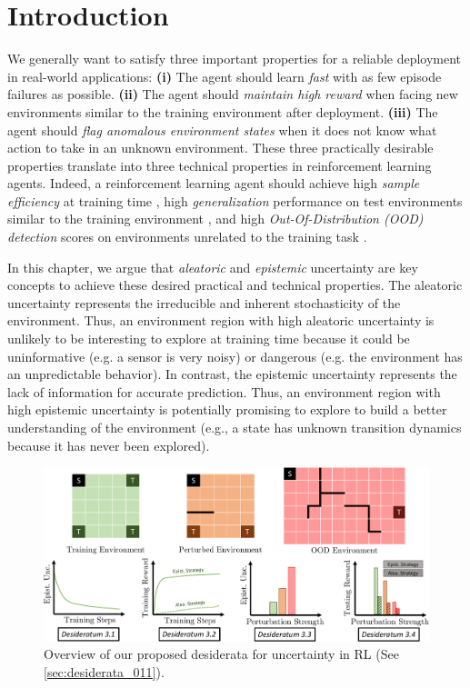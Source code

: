 \vspace{-3mm}
\section{Introduction}
\label{sec:introduction_011}

We generally want to satisfy three important properties for a reliable deployment in real-world applications: \textbf{(i)} The agent should learn \emph{fast} with as few episode failures as possible. \textbf{(ii)} The agent should \emph{maintain high reward} when facing new environments similar to the training environment after deployment. \textbf{(iii)} The agent should \emph{flag anomalous environment states} when it does not know what action to take in an unknown environment. These three practically desirable properties translate into three technical properties in reinforcement learning agents. Indeed, a reinforcement learning agent should achieve high \emph{sample efficiency} at training time \citep{sample-efficient-ac}, high \emph{generalization} performance on test environments similar to the training environment \citep{epistemic-pomdp}, and high \emph{Out-Of-Distribution (OOD) detection} scores on environments unrelated to the training task \citep{ood-detection-survey, ood-automotive-perception}. 

In this chapter, we argue that \emph{aleatoric} and \emph{epistemic} uncertainty are key concepts to achieve these desired practical and technical properties. The aleatoric uncertainty represents the irreducible and inherent stochasticity of the environment. Thus, an environment region with high aleatoric uncertainty is unlikely to be interesting to explore at training time because it could be uninformative (e.g. a sensor is very noisy) or dangerous (e.g. the environment has an unpredictable behavior). In contrast, the epistemic uncertainty represents the lack of information for accurate prediction. Thus, an environment region with high epistemic uncertainty is potentially promising to explore to build a better understanding of the environment (e.g., a state has unknown transition dynamics because it has never been explored).

\begin{figure}[t]
    \centering
    \includegraphics[width=.99\linewidth]{sections/011_icml2022/resources/diagram-cropped_2.pdf}
    \caption{Overview of our proposed desiderata for uncertainty in RL (See \cref{sec:desiderata_011}).}
    \label{fig:diagram}
\end{figure}

